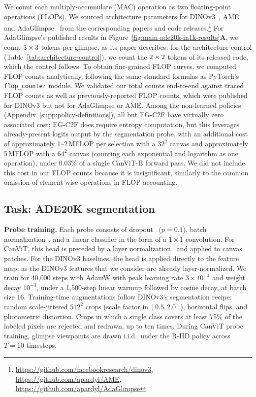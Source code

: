 \documentclass{article}
\begin{document}
We count each multiply-accumulate (MAC) operation as two floating-point operations (FLOPs). We sourced architecture parameters for DINOv3~\cite{simeoniDINOv32026}, AME~\cite{AMEPardylRK0T23} and AdaGlimpse~\cite{pardylAdaGlimpseActiveVisual2025} from the corresponding papers and code releases.\footnote{\url{https://github.com/facebookresearch/dinov3}, \url{https://github.com/apardyl/AME},\\ \url{https://github.com/apardyl/AdaGlimpse}}
For AdaGlimpse's published results in Figure~\ref{fig:main-ade20k-in1k-results}\textbf{A}, we count $3 \times 3$ tokens per glimpse, as its paper describes; for the architecture control (Table~\ref{tab:architecture-control}), we count the $2 \times 2$ tokens of its released code, which the control follows.
To obtain fine-grained FLOP curves, we computed FLOP counts analytically, following the same standard formulas as PyTorch's \texttt{flop\_counter} module.
We validated our total counts end-to-end against traced FLOP counts as well as previously-reported FLOP counts, which were published for DINOv3 but not for AdaGlimpse or AME.
Among the non-learned policies (Appendix~\ref{supp:policy-definitions}), all but EG-C2F have virtually zero associated cost; EG-C2F does require entropy computation, but this leverages already-present logits output by the segmentation probe, with an additional cost of approximately 1--2\,MFLOP per selection with a $32^2$ canvas and approximately 5\,MFLOP with a $64^2$ canvas (counting each exponential and logarithm as one operation), under 0.03\% of a single CanViT-B forward pass.
We did not include this cost in our FLOP counts because it is insignificant, similarly to the common omission of element-wise operations in FLOP accounting.

\subsection{Task: ADE20K segmentation}
\label{supp:task-ade20k}

\textbf{Probe training.} Each probe consists of dropout~\cite{srivastavaDropoutSimpleWay2014} ($p = 0.1$), batch normalization~\cite{ioffeBatchNormalizationAccelerating2015}, and a linear classifier in the form of a $1 \times 1$ convolution.
For CanViT, this head is preceded by a layer normalization~\cite{baLayerNormalization2016} and applied to canvas patches.
For the DINOv3 baselines, the head is applied directly to the feature map, as the DINOv3 features that we consider are already layer-normalized.
We train for 40{,}000 steps with AdamW with peak learning rate $3 \times 10^{-4}$ and weight decay $10^{-3}$,
under a 1{,}500-step linear warmup followed by cosine decay,
at batch size 16.
Training-time augmentations follow DINOv3's segmentation recipe: random scale-jittered $512^2$ crops (scale factor in $[0.5, 2.0]$), horizontal flips, and photometric distortion.
Crops in which a single class covers at least 75\% of the labeled pixels are rejected and redrawn, up to ten times.
During CanViT probe training, glimpse viewpoints are drawn i.i.d.\ under the R-IID policy across $T = 10$ timesteps.
\end{document}
